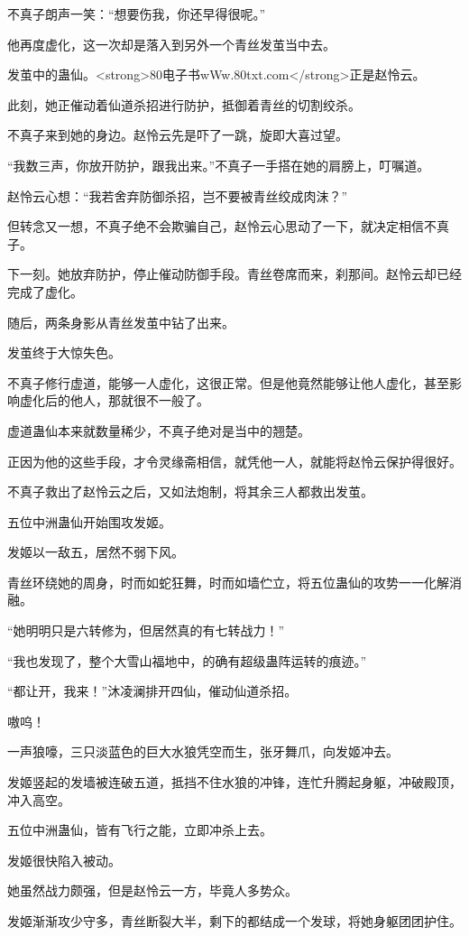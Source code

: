 \begin{this_body}
不真子朗声一笑：“想要伤我，你还早得很呢。”

他再度虚化，这一次却是落入到另外一个青丝发茧当中去。

发茧中的蛊仙。<strong>80电子书wWw.80txt.com</strong>正是赵怜云。

此刻，她正催动着仙道杀招进行防护，抵御着青丝的切割绞杀。

不真子来到她的身边。赵怜云先是吓了一跳，旋即大喜过望。

“我数三声，你放开防护，跟我出来。”不真子一手搭在她的肩膀上，叮嘱道。

赵怜云心想：“我若舍弃防御杀招，岂不要被青丝绞成肉沫？”

但转念又一想，不真子绝不会欺骗自己，赵怜云心思动了一下，就决定相信不真子。

下一刻。她放弃防护，停止催动防御手段。青丝卷席而来，刹那间。赵怜云却已经完成了虚化。

随后，两条身影从青丝发茧中钻了出来。

发茧终于大惊失色。

不真子修行虚道，能够一人虚化，这很正常。但是他竟然能够让他人虚化，甚至影响虚化后的他人，那就很不一般了。

虚道蛊仙本来就数量稀少，不真子绝对是当中的翘楚。

正因为他的这些手段，才令灵缘斋相信，就凭他一人，就能将赵怜云保护得很好。

不真子救出了赵怜云之后，又如法炮制，将其余三人都救出发茧。

五位中洲蛊仙开始围攻发姬。

发姬以一敌五，居然不弱下风。

青丝环绕她的周身，时而如蛇狂舞，时而如墙伫立，将五位蛊仙的攻势一一化解消融。

“她明明只是六转修为，但居然真的有七转战力！”

“我也发现了，整个大雪山福地中，的确有超级蛊阵运转的痕迹。”

“都让开，我来！”沐凌澜排开四仙，催动仙道杀招。

嗷呜！

一声狼嚎，三只淡蓝色的巨大水狼凭空而生，张牙舞爪，向发姬冲去。

发姬竖起的发墙被连破五道，抵挡不住水狼的冲锋，连忙升腾起身躯，冲破殿顶，冲入高空。

五位中洲蛊仙，皆有飞行之能，立即冲杀上去。

发姬很快陷入被动。

她虽然战力颇强，但是赵怜云一方，毕竟人多势众。

发姬渐渐攻少守多，青丝断裂大半，剩下的都结成一个发球，将她身躯团团护住。


\end{this_body}
